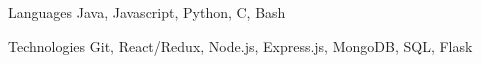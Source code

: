 

\begin{cvskills}

  \cvskill
    {Languages} %
    {Java, Javascript, Python, C, Bash} %

  \cvskill
    {Technologies} %
    {Git, React/Redux, Node.js, Express.js, MongoDB, SQL, Flask} %

\end{cvskills}
